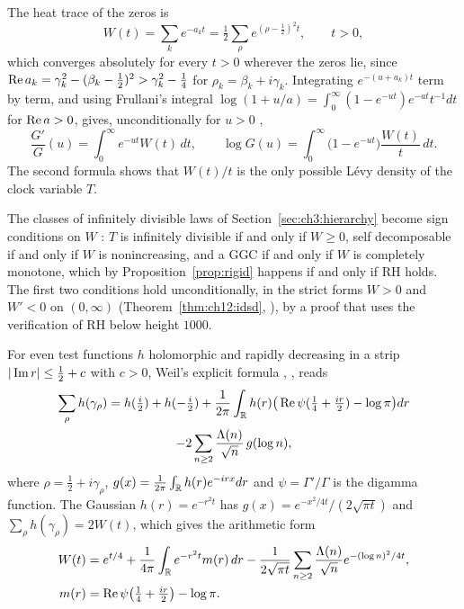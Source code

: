 The heat trace of the zeros is
\[
W(t)=\sum_ke^{-a_kt}=\tfrac12\sum_\rho e^{(\rho-\frac12)^2t},\qquad t>0,
\]
which converges absolutely for every $t>0$ wherever the zeros lie, since $\operatorname{Re} a_k=\gamma_k^2-(\beta_k-\frac12)^2>\gamma_k^2-\frac14$ for $\rho_k=\beta_k+i\gamma_k$. Integrating $e^{-(u+a_k)t}$ term by term, and using Frullani's integral $\log(1+u/a)=\int_0^\infty(1-e^{-ut})e^{-at}t^{-1}dt$ for $\operatorname{Re} a>0$, gives, unconditionally for $u>0$ \cite[Theorem 4.3]{P26},
\[
\frac{G'}{G}(u)=\int_0^\infty e^{-ut}W(t)\,dt,\qquad \log G(u)=\int_0^\infty\big(1-e^{-ut}\big)\frac{W(t)}t\,dt .
\]
The second formula shows that $W(t)/t$ is the only possible L\'evy density of the clock variable $T$.

The classes of infinitely divisible laws of Section~\ref{sec:ch3:hierarchy} become sign conditions on $W$ \cite[Theorem 4.6]{P26}: $T$ is infinitely divisible if and only if $W\ge0$, self decomposable if and only if $W$ is nonincreasing, and a GGC if and only if $W$ is completely monotone, which by Proposition~\ref{prop:rigid} happens if and only if RH holds. The first two conditions hold unconditionally, in the strict forms $W>0$ and $W'<0$ on $(0,\infty)$ (Theorem~\ref{thm:ch12:idsd}, \cite[Theorem A]{P26}), by a proof that uses the verification of RH below height $1000$.

For even test functions $h$ holomorphic and rapidly decreasing in a strip $|\operatorname{Im} r|\le\frac12+c$ with $c>0$, Weil's explicit formula \cite{Weil52}, \cite[Theorem 5.12]{IwaniecKowalski04}, reads
\begin{multline*}
\sum_\rho h(\gamma_\rho)=h(\tfrac i2)+h(-\tfrac i2)+\frac1{2\pi}\int_{\mathbb{R}}h(r)\big(\operatorname{Re}\psi(\tfrac14+\tfrac{ir}2)-\log\pi\big)dr\\
-2\sum_{n\ge2}\frac{\Lambda(n)}{\sqrt n}\,g(\log n),
\end{multline*}
where $\rho=\frac12+i\gamma_\rho$, $g(x)=\frac1{2\pi}\int_{\mathbb{R}}h(r)e^{-irx}dr$ and $\psi=\Gamma'/\Gamma$ is the digamma function. The Gaussian $h(r)=e^{-r^2t}$ has $g(x)=e^{-x^2/4t}/(2\sqrt{\pi t})$ and $\sum_\rho h(\gamma_\rho)=2W(t)$, which gives the arithmetic form \cite[Theorem 4.4]{P26}
\begin{equation}\label{eq:ch2:Warith}
\begin{aligned}
W(t)&=e^{t/4}+\frac1{4\pi}\int_{\mathbb R}e^{-r^2t}m(r)\,dr-\frac1{2\sqrt{\pi t}}\sum_{n\ge2}\frac{\Lambda(n)}{\sqrt n}e^{-(\log n)^2/4t},\\
m(r)&=\operatorname{Re}\psi\big(\tfrac14+\tfrac{ir}2\big)-\log\pi .
\end{aligned}
\end{equation}


